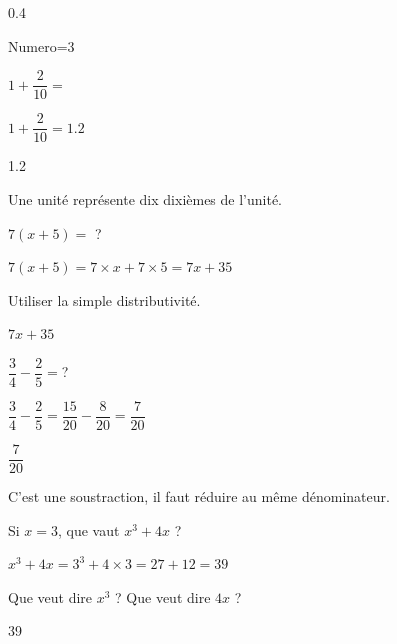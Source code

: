 \documentclass[12pt,french]{article}
\begin{document}
\begin{Codes}{0.4}{}
\begin{Maquette}[DS,CorrigeFin]{Numero=3}
  \begin{exercice} %
    $1+\dfrac2{10}=$
  \end{exercice}
  \begin{Solution}
    $1+\dfrac2{10}=\num{1.2}$
  \end{Solution}
  \begin{Reponse}
    \num{1.2}
  \end{Reponse}
  \begin{Indice}
    Une unité représente dix dixièmes de l'unité.
  \end{Indice}
  \begin{exercice}[PasCorrige] %
      $7(x+5)=$ ?
  \end{exercice}
  \begin{Solution}
    $7(x+5)=7\times x+7\times 5=7x+35$
  \end{Solution}
  \begin{Indice}
    Utiliser la simple distributivité.
  \end{Indice}
  \begin{Reponse}
    $7x+35$
  \end{Reponse}
  \begin{exercice}[Direct] %
    $\dfrac34-\dfrac25=$?
  \end{exercice}
  \begin{Solution}
    $\dfrac34-\dfrac25=\dfrac{15}{20}-\dfrac8{20}=\dfrac7{20}$
  \end{Solution}
  \begin{Reponse}
    $\dfrac7{20}$
  \end{Reponse}
  \begin{Indice}
    C'est une soustraction, il faut réduire au même dénominateur.
  \end{Indice}
  \begin{exercice}[Pouce] %
    Si $x=3$, que vaut $x^3+4x$ ?
  \end{exercice}
  \begin{Solution}
    $x^3+4x=3^3+4\times3=27+12=39$
  \end{Solution}
  \begin{Indice}
    Que veut dire $x^3$ ? Que veut dire $4x$ ?
  \end{Indice}
  \begin{Reponse}
    39
  \end{Reponse}
\end{Maquette}
\end{Codes}
\end{document}
